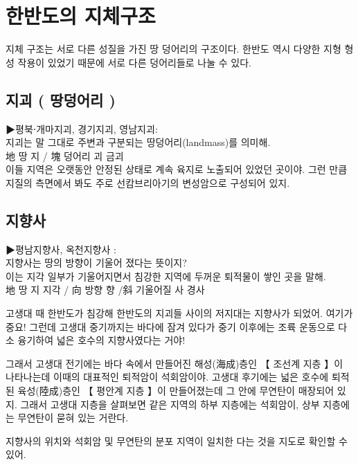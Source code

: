 \documentclass[12pt,a4paper]{book}
\newcommand{\SectionMargin}			{\newpage  \null \vskip 0cm}
\begin{document}
	\SectionMargin
	\section{한반도의 지체구조}
	\null


		지체 구조는 서로 다른 성질을 가진 땅 덩어리의 구조이다. 
		한반도 역시 다양한 지형 형성 작용이 있었기 때문에 서로 다른 덩어리들로 나눌 수 있다.

		\subsection{지괴 ( 땅덩어리 )}
				▶평북⋅개마지괴, 경기지괴, 영남지괴: \\
				지괴는 말 그대로 주변과 구분되는 땅덩어리(landmass)를 의미해. \\
				地 땅 지 / 塊 덩어리 괴 금괴\\
				이들 지역은 오랫동안 안정된 상태로 계속 육지로 노출되어 있었던 곳이야.
				그런 만큼 지질의 측면에서 봐도 주로 선캄브리아기의 변성암으로 구성되어 있지.
				
		\subsection{지향사}
				▶평남지향사, 옥천지향사 : \\
				지향사는 땅의 방향이 기울어 졌다는 뜻이지? \\
				이는 지각 일부가 기울어지면서 침강한 지역에 두꺼운 퇴적물이 쌓인 곳을 말해. \\
				地 땅 지 지각 / 向 방향 향 /斜 기울어질 사 경사

				고생대 때 한반도가 침강해 한반도의 지괴들 사이의 저지대는 지향사가 되었어.
				여기가 중요! 
				그런데 고생대 중기까지는 바다에 잠겨 있다가 
				중기 이후에는 조륙 운동으로 다소 융기하여 넓은 호수의 지향사였다는 거야!
				
				그래서 고생대 전기에는 바다 속에서 만들어진 해성(海成)층인 【 조선계 지층 】이 나타나는데 
				이때의 대표적인 퇴적암이 석회암이야.
				고생대 후기에는 넓은 호수에 퇴적된 육성(陸成)층인  【 평안계 지층 】이 만들어졌는데
				그 안에 무연탄이 매장되어 있지.
				그래서 고생대 지층을 살펴보면 
				같은 지역의 하부 지층에는 석회암이, 상부 지층에는 무연탄이 묻혀 있는 거란다.
				
				지향사의 위치와 석회암 및 무연탄의 분포 지역이 일치한 다는 것을 지도로 확인할 수 있어.
				
				
				
\end{document}

